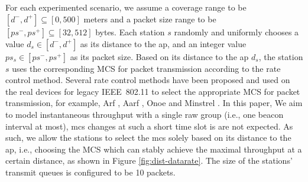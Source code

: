 For each experimented scenario, we assume a coverage range to be $[d^-, d^+]  \subseteq [0, 500] $  meters and a packet size range to be $[ps^-, ps^+] \subseteq [32, 512] $ bytes. Each station $s$ randomly and uniformly chooses a value $d_s \in [d^-, d^+]$ as its distance to the \gls{ap}, and an integer value $ps_s \in [ps^-, ps^+]$ as its packet size. Based on its distance to the \gls{ap} $d_s$, the station $s$ uses the corresponding MCS for packet transmission according to the rate control method. Several rate control methods have been proposed and used on the real devices for legacy IEEE~802.11 to select the appropriate MCS for packet transmission, for example, Arf \cite{arf1997},  Aarf \cite{aarf2004}, Onoe \cite{Onoe} and Minstrel \cite{minstrel}. In this paper, We aim to model instantaneous throughput with a single \gls{raw} group (i.e., one beacon interval at most),  \gls{mcs} changes at such a short time slot is are not expected. As such, we allow the stations to select the \gls{mcs} solely based on its distance to the \gls{ap}, i.e., choosing the MCS which can stably achieve the maximal throughput at a certain distance, as shown in Figure \ref{fig:dist-datarate}. The size of the stations' transmit queues is configured to be 10 packets. 











